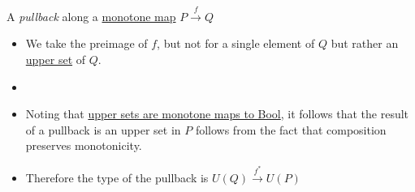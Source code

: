 
A \emph{pullback} along a \href{doc/math/Seven Sketches in Compositionality/Generative Effects/4 Monotone maps/Monotone map}{monotone map} $P \xrightarrow{f} Q$

\begin{itemize}
    \item We take the preimage of $f$, but not for a single element of $Q$ but rather an \href{doc/math/Seven Sketches in Compositionality/Generative Effects/3 Preorders/Upper set}{upper set} of $Q$.
    \item {}
    \item Noting that \href{doc/1 math/Seven Sketches in Compositionality/1 Generative Effects/4 Monotone maps/Monotones to bool}{upper sets are monotone maps to Bool}, it follows that the result of a pullback is an upper set in $P$ follows from the fact that composition preserves monotonicity.
    \item Therefore the type of the pullback is $U(Q) \xrightarrow{f^*} U(P)$
\end{itemize}


